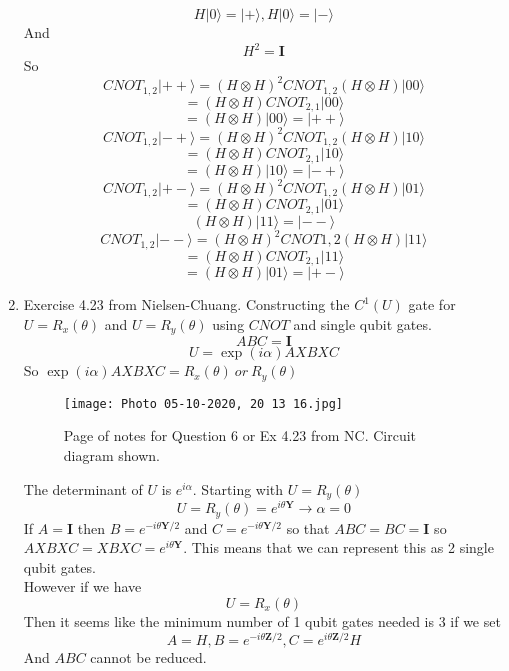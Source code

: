 \documentclass[12pt]{article}
\newcommand{\ket}[1]{\vert{#1}\rangle}
\begin{document}
\begin{enumerate}
    $$ H \ket{0} = \ket{+}, H \ket{0} = \ket{-} $$
    And 
    $$ H^2 = \textbf{I} $$
    So 
    $$ CNOT_{1,2} \ket{++} = (H \otimes H)^2 CNOT_{1,2} (H \otimes H) \ket{00} $$
    $$ = (H \otimes H) CNOT_{2,1} \ket{00} $$
    $$ = (H \otimes H) \ket{00} = \ket{++} $$
    $$ CNOT_{1,2} \ket{-+} = (H \otimes H)^2 CNOT_{1,2} (H \otimes H) \ket{10} $$ 
    $$ = (H \otimes H) CNOT_{2,1} \ket{10} $$
    $$ = (H \otimes H) \ket{10} = \ket{-+} $$
    $$ CNOT_{1,2} \ket{+-} = (H \otimes H)^2 CNOT_{1,2} (H \otimes H) \ket{01} $$
    $$ = (H \otimes H) CNOT_{2,1} \ket{01} $$
    $$ (H \otimes H) \ket{11} = \ket{--} $$
    $$ CNOT_{1,2} \ket{--} = (H \otimes H)^2 CNOT{1,2} (H \otimes H) \ket{11} $$ 
    $$ = (H \otimes H) CNOT_{2,1} \ket{11} $$
    $$ = (H \otimes H) \ket{01} = \ket{+-} $$

    \item Exercise 4.23 from Nielsen-Chuang. Constructing the $C^1(U)$ gate for $U = R_x (\theta)$ and $U = R_y (\theta)$ using $CNOT$ and single qubit gates. 
    $$ ABC = \textbf{I} $$
    $$ U = \exp(i \alpha) AXBXC$$ 
    So $\exp (i \alpha) AXBXC = R_x (\theta) \ or \ R_y (\theta) $
    \begin{figure}
        \texttt{[image: Photo 05-10-2020, 20 13 16.jpg]}
        \centering
        \caption{Page of notes for Question 6 or Ex 4.23 from NC. Circuit diagram shown.}
    \end{figure}
The determinant of $U$ is $e^{i \alpha}$. Starting with $U = R_y (\theta)$ 
$$ U = R_y (\theta) = e^{i \theta \textbf{Y}} \rightarrow \alpha =0 $$
If $A = \textbf{I}$ then $B = e^{-i \theta \textbf{Y} /2}$ and $C = e^{-i \theta \textbf{Y} /2}$ so that $ABC = BC = \textbf{I}$ so $AXBXC = XBXC = e^{i \theta \textbf{Y}}$. This means that we can represent this as 2 single qubit gates.
\\
However if we have 
$$ U = R_x (\theta) $$
Then it seems like the minimum number of 1 qubit gates needed is 3 if we set 
$$ A = H, B = e^{-i \theta \textbf{Z}/2}, C = e^{i \theta \textbf{Z}/2}H $$
And $ABC$ cannot be reduced. 
\end{enumerate}
\pagebreak
\end{document}
